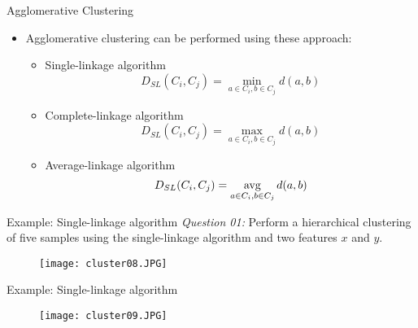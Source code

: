 \begin{frame}{Agglomerative Clustering}
\begin{itemize}
\item Agglomerative clustering can be performed using these approach:
\begin{itemize}
\item Single-linkage algorithm
\begin{equation}
D_{SL}(C_i,C_j)=\min_{a\in C_i,b\in C_j}{d(a,b)} \nonumber
\end{equation}
\item Complete-linkage algorithm
\begin{equation}
D_{SL}(C_i,C_j)=\max_{a\in C_i,b\in C_j}{d(a,b)} \nonumber
\end{equation}
\item Average-linkage algorithm
\begin{equation}
D_{SL}(C_i,C_j)=\mathop {\rm avg}\limits_{a\in C_i,b\in C_j}{d(a,b)} \nonumber
\end{equation}
\end{itemize}
\end{itemize}
\end{frame}



\begin{frame}{Example: Single-linkage algorithm}
\textit{\color{mycolor2}Question 01:} Perform a hierarchical clustering of five samples using the single-linkage algorithm and two features $x$ and $y$.
\begin{figure}
\texttt{[image: cluster08.JPG]}
\end{figure}
\end{frame}

\begin{frame}{Example: Single-linkage algorithm}
\begin{figure}
\texttt{[image: cluster09.JPG]}
\end{figure}
\end{frame}

